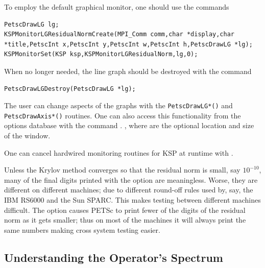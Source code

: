 To employ the default graphical monitor, one should use the
commands
\begin{lstlisting}
PetscDrawLG lg;
KSPMonitorLGResidualNormCreate(MPI_Comm comm,char *display,char *title,PetscInt x,PetscInt y,PetscInt w,PetscInt h,PetscDrawLG *lg);
KSPMonitorSet(KSP ksp,KSPMonitorLGResidualNorm,lg,0);
\end{lstlisting}
When no longer needed, the line graph should be destroyed
with the command
\begin{lstlisting}
PetscDrawLGDestroy(PetscDrawLG *lg);
\end{lstlisting}
The user can change aspects of the graphs with the \lstinline{PetscDrawLG*()} and
\lstinline{PetscDrawAxis*()} routines.  
One can also access this functionality from the options database
with the command  \trl{[x,y,w,h]}. ,
where  are the optional location and size of the window.

One can cancel hardwired monitoring routines for KSP at runtime with
. 

Unless the Krylov method converges so that the residual norm is small,
say $10^{-10}$, many of the final digits printed with the 
option are meaningless. Worse, they are different on different
machines; due to different round-off rules used by, say, the IBM RS6000
and the Sun SPARC. This makes testing between different machines
difficult. The option  
causes PETSc to print fewer of the digits of the residual norm
as it gets smaller; thus on most of the machines it will always
print the same numbers making cross system testing easier.

\subsection{Understanding the Operator's Spectrum}

